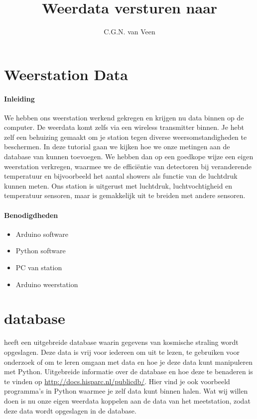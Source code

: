 

\title{Weerdata versturen naar \hisparc}
\author{C.G.N. van Veen}



\maketitle

\section{Weerstation Data}

\paragraph{Inleiding} We hebben ons weerstation werkend gekregen en krijgen nu 
data binnen op de computer. De weerdata komt zelfs via een wireless
transmitter binnen. Je hebt zelf een behuizing gemaakt om je station
tegen diverse weersomstandigheden te beschermen. In deze tutorial gaan we kijken
hoe we onze metingen aan de database van \hisparc kunnen toevoegen. 
We hebben dan op een goedkope wijze een eigen weerstation verkregen, waarmee
we de efficiëntie van detectoren bij veranderende temperatuur en bijvoorbeeld 
het aantal showers als functie van de luchtdruk kunnen meten. Ons station is uitgerust 
met luchtdruk, luchtvochtigheid en temperatuur sensoren, maar is gemakkelijk uit 
te breiden met andere sensoren. 

\paragraph{Benodigdheden}

\begin{itemize}  
    \item Arduino software
    \item Python software
    \item PC van \hisparc station
    \item Arduino weerstation
    
\end{itemize}

\section{\hisparc database}

\hisparc heeft een uitgebreide database waarin gegevens van kosmische straling
wordt opgeslagen. Deze data is vrij voor iedereen om uit te lezen, te gebruiken
voor onderzoek of om te leren omgaan met data en hoe je deze data kunt manipuleren met Python.
Uitgebreide informatie over de \hisparc database en hoe deze te benaderen is te 
vinden op \url{http://docs.hisparc.nl/publicdb/}. Hier vind je ook voorbeeld
programma's in Python waarmee je zelf data kunt binnen halen.
Wat wij willen doen is nu onze eigen weerdata koppelen aan de data van het \hisparc 
meetstation, zodat deze data wordt opgeslagen in de \hisparc database.


